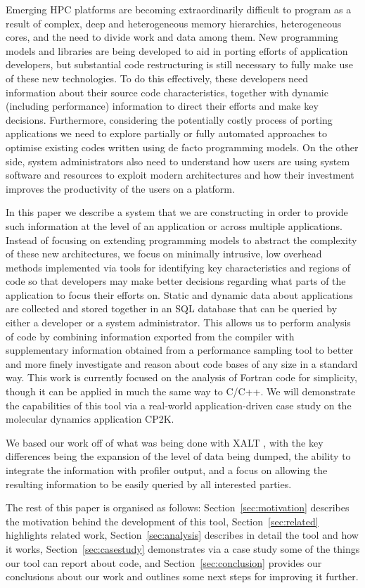 Emerging HPC platforms are becoming extraordinarily difficult to program as a result of complex, deep and heterogeneous memory hierarchies, heterogeneous cores, and the need to divide work and data among them.
New programming models and libraries are being developed to aid in porting efforts of application developers, but substantial code restructuring is still necessary to fully make use of these new technologies.
To do this effectively, these developers need information about their source code characteristics, together with dynamic (including performance) information to direct their efforts and make key decisions.
Furthermore, considering the potentially costly process of porting applications we need to explore partially or fully automated approaches to optimise existing codes written using de facto programming models.
On the other side, system administrators also need to understand how users are using system software and resources to exploit modern architectures and how their investment improves the productivity of the users on a platform.

In this paper we describe a system that we are constructing in order to provide such information at the level of an application or across multiple applications.
Instead of focusing on extending programming models to abstract the complexity of these new architectures, we focus on minimally intrusive, low overhead methods implemented via tools for identifying key characteristics and regions of code so that developers may make better decisions regarding what parts of the application to focus their efforts on.
Static and dynamic data about applications are collected and stored together in an \acs{SQL} database that can be queried by either a developer or a system administrator.
This allows us to perform analysis of code by combining information exported from the compiler with supplementary information obtained from a performance sampling tool to better and more finely investigate and reason about code bases of any size in a standard way.
This work is currently focused on the analysis of Fortran code for simplicity, though it can be applied in much the same way to C/C++.
We will demonstrate the capabilities of this tool via a real-world application-driven case study on the molecular dynamics application CP2K.

We based our work off of what was being done with XALT \cite{7081224}, with the key differences being the expansion of the level of data being dumped, the ability to integrate the information with profiler output, and a focus on allowing the resulting information to be easily queried by all interested parties.

The rest of this paper is organised as follows: Section~\ref{sec:motivation} describes the motivation behind the development of this tool, Section~\ref{sec:related} highlights related work, Section~\ref{sec:analysis} describes in detail the tool and how it works, Section~\ref{sec:casestudy} demonstrates via a case study some of the things our tool can report about code, and Section~\ref{sec:conclusion} provides our conclusions about our work and outlines some next steps for improving it further.

